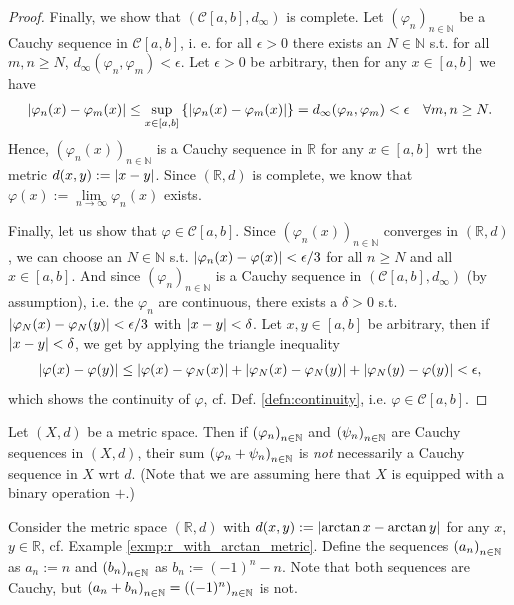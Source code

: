 \begin{proof}
	Finally, we show that $(\mathcal C[a, b], d_{\infty})$ is complete. Let $(\varphi_n)_{n\in\mathbb N}$ be a Cauchy sequence in $\mathcal C[a, b]$, i. e. for all $\epsilon > 0$ there exists an $N\in\mathbb N$ s.t. for all $m, n\geq N$, $d_{\infty}(\varphi_n, \varphi_m) < \epsilon$. Let $\epsilon > 0$ be arbitrary, then for any $x\in [a, b]$ we have
	\begin{align}
		\abs{\varphi_n(x) - \varphi_m(x)} \leq \sup_{x\in [a, b]}\left\{ \abs{\varphi_{n}(x) - \varphi_{m}(x)} \right\} = d_{\infty}(\varphi_n, \varphi_m) < \epsilon \quad\forall m, n\geq N.
	\end{align} 
	Hence, $\left(\varphi_n(x)\right)_{n\in\mathbb N}$ is a Cauchy sequence in $\mathbb R$ for any $x\in[a, b]$ wrt the metric $d(x, y) := \abs{x - y}$. Since $\left(\mathbb R, d\right)$ is complete, we know that $\varphi(x) := \lim\limits_{n\to\infty}\varphi_n(x)$ exists. 
	
	Finally, let us show that $\varphi\in\mathcal C[a, b]$. Since $\left(\varphi_n(x)\right)_{n\in\mathbb N}$ converges in $(\mathbb R, d)$, we can choose an $N\in\mathbb N$ s.t. $\abs{\varphi_n(x) - \varphi(x)} < \epsilon/3$ for all $n\geq N$ and all $x\in[a, b]$. And since $\left(\varphi_n\right)_{n\in\mathbb N}$ is a Cauchy sequence in $(\mathcal C[a, b], d_{\infty})$ (by assumption), i.e. the $\varphi_n$ are continuous, there exists a $\delta > 0$ s.t. $\abs{\varphi_N(x) - \varphi_{N}(y)} < \epsilon/3$ with $\abs{x - y} < \delta$. Let $x, y\in [a, b]$ be arbitrary, then if $\abs{x-y} < \delta$, we get by applying the triangle inequality
	\begin{align}
		\abs{\varphi(x) - \varphi(y)} \leq \abs{\varphi(x) - \varphi_N(x)} + \abs{\varphi_N(x) - \varphi_N(y)} + \abs{\varphi_N(y) - \varphi(y)} < \epsilon,
	\end{align}
	which shows the continuity of $\varphi$, cf. Def. \ref{defn:continuity}, i.e. $\varphi\in\mathcal C[a, b]$.
\end{proof}

\begin{remark}
	Let $(X, d)$ be a metric space. Then if $\seq[\varphi_n]$ and $\seq[\psi_n]$ are Cauchy sequences in $(X, d)$, their sum $\seq[\varphi_n + \psi_n]$ is \textit{not} necessarily a Cauchy sequence in $X$ wrt $d$. (Note that we are assuming here that $X$ is equipped with a binary operation $+$.)
\end{remark}

\begin{exmp}\label{exmp:counter_exmp_sum_Cauchy_not_Cauchy}
	Consider the metric space $(\mathbb R, d)$ with $d(x, y) := \abs{\arctan x - \arctan y}$ for any $x$, $y\in\mathbb R$, cf. Example \ref{exmp:r_with_arctan_metric}. Define the sequences $\seq[a_n]$ as $a_n := n$ and $\seq[b_n]$ as $b_n := (-1)^n - n$. Note that both sequences are Cauchy, but $\seq[a_n + b_n] = \seq[(-1)^n]$ is not.
\end{exmp}

